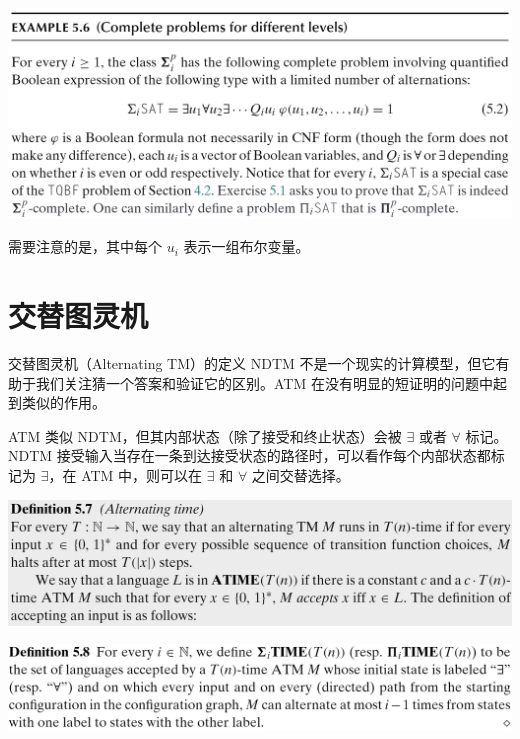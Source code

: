 \documentclass[UTF8,aspectratio=169,mathserif]{beamer}
\begin{document}
	\begin{frame}
		\includegraphics[width=\linewidth]{../5 & 6/note.assets/image-20210427093527360.png}\newline
		
		需要注意的是，其中每个 $u_i$ 表示一组布尔变量。
	\end{frame}
	
	\section{交替图灵机}
	\begin{frame}{交替图灵机（Alternating TM）的定义}
		NDTM 不是一个现实的计算模型，但它有助于我们关注猜一个答案和验证它的区别。ATM 在没有明显的短证明的问题中起到类似的作用。\newline
		
		ATM 类似 NDTM，但其内部状态（除了接受和终止状态）会被 $\exists$ 或者 $\forall$ 标记。NDTM 接受输入当存在一条到达接受状态的路径时，可以看作每个内部状态都标记为 $\exists$，在 ATM 中，则可以在 $\exists$ 和 $\forall$ 之间交替选择。
	\end{frame}
	\begin{frame}
		\includegraphics[width=\linewidth]{../5 & 6/note.assets/image-20210427213236953.png}\newline
		
		\includegraphics[width=\linewidth]{../5 & 6/note.assets/image-20210427094554653.png}
	\end{frame}
	
\end{document}
